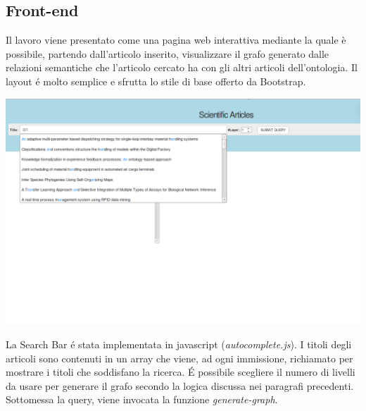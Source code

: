 \documentclass[11pt,a4paper]{article}
\begin{document}
\subsection{Front-end}
Il lavoro viene presentato come una pagina web interattiva mediante la quale è possibile, partendo dall'articolo inserito, visualizzare il grafo generato dalle relazioni semantiche che l'articolo cercato ha con gli altri articoli dell'ontologia. Il layout \'e molto semplice e sfrutta lo stile di base offerto da Bootstrap.  

\begin{center}
\includegraphics[scale=0.40]{immaginiTesina/vuoto.png}
\end{center}

La Search Bar \'e stata implementata in javascript (\textit{autocomplete.js}). I titoli degli articoli sono contenuti in un array che viene, ad ogni immissione, richiamato per mostrare i titoli che soddisfano la ricerca. \'E possibile scegliere il numero di livelli da usare per generare il grafo secondo la logica discussa nei paragrafi precedenti. Sottomessa la query, viene invocata la funzione \textit{generate-graph}. \newline \newline\newline

\end{document}
